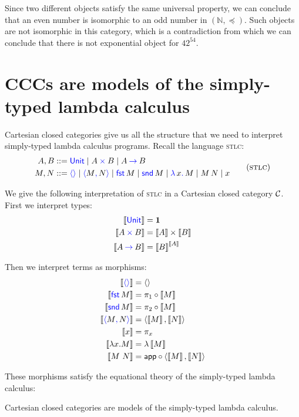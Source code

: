 Since two different objects satisfy the same universal property, 
we can conclude that an even number is isomorphic to an 
odd number in $(\mathbb{N}, \preceq)$. Such 
objects are not isomorphic in this category, which is a 
contradiction from which we can conclude that there is not 
exponential object for $42^{54}$.


\section{CCCs are models of the simply-typed lambda calculus}
Cartesian closed categories give us all the structure that we need to interpret
simply-typed lambda calculus programs. Recall the language \textsc{stlc}:
\begin{gather}
  \begin{aligned}
   A,B &::= \plkw{Unit}
     \mid A \pltimes B
     \mid A \plto B
  \\
  M,N &::= \plunit{}
      \mid \plpair{M}{N}
      \mid \plfst{M}
      \mid \plsnd{M}
      \mid \pllam{x}{M}
      \mid \plapp{M}{N}
      \mid x
  \end{aligned}
  \tag{\textsc{stlc}}
\end{gather}

We give the following interpretation of \textsc{stlc} 
in a Cartesian closed category $\mathcal C$. 
First we interpret types:
\begin{align*}
  \left\llbracket \mathsf{{\color{blue}Unit}} \right\rrbracket &= \mathbf{1} \\ 
  \left\llbracket A \mathbin{{\color{blue}\times}} B \right\rrbracket &= \left\llbracket A \right\rrbracket \times \left\llbracket B \right\rrbracket \\ 
  \left\llbracket A \mathbin{{\color{blue}\to}} B \right\rrbracket &= \left\llbracket B \right\rrbracket^{\left\llbracket A \right\rrbracket}
\end{align*}

Then we interpret terms as morphisms:
    \begin{align*}
    \llbr{\plunit} &= \angled{} \\
    \llbr{\plfst{M}} &= \pi_1 \circ \llbr{M} \\
    \llbr{\plsnd{M}} &= \pi_2 \circ \llbr{M} \\
    \llbr{\plpair{M}{N}} &= \angled{\llbr{M},\llbr{N}} \\
    \llbr{x} &= \pi_x \\
    \llbr{\lambda x . M} &= \lambda \dbracket{M} \\ 
    \llbr{M~N} &= \app \circ \langle \dbracket{M}, \dbracket{N} \rangle
  \end{align*}

These morphisms satisfy the equational theory of the simply-typed 
lambda calculus:
\begin{theorem}
  Cartesian closed categories are models of the simply-typed 
  lambda calculus.
\end{theorem}

